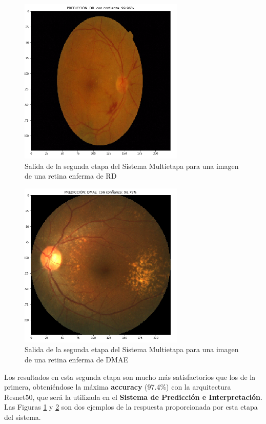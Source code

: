 \documentclass[
  12pt,
  spanish,
  a4paperpaper,
]{report}
\begin{document}
\begin{figure}
\centering
\includegraphics[width=0.7\textwidth,height=\textheight]{source/figures/dr1.png}
\caption{Salida de la segunda etapa del Sistema Multietapa para una
imagen de una retina enferma de RD \label{dr1}}
\end{figure}

\begin{figure}
\centering
\includegraphics[width=0.7\textwidth,height=\textheight]{source/figures/dr2.png}
\caption{Salida de la segunda etapa del Sistema Multietapa para una
imagen de una retina enferma de DMAE \label{dr2}}
\end{figure}

Los resultados en esta segunda etapa son mucho más satisfactorios que
los de la primera, obteniéndose la máxima \textbf{accuracy} (97.4\%) con
la arquitectura Resnet50, que será la utilizada en el \textbf{Sistema de
Predicción e Interpretación}. Las Figuras \ref{dr1} y \ref{dr2} son dos
ejemplos de la respuesta proporcionada por esta etapa del sistema.
\end{document}
